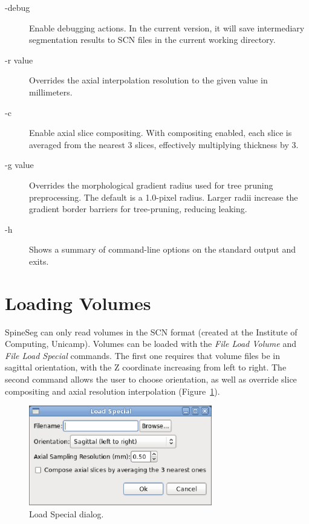 \documentclass[12pt]{report}
\begin{document}
\begin{description}
\item[-debug] Enable debugging actions. In the current version, it will save intermediary
segmentation results to SCN files in the current working directory.
\item[-r value] Overrides the axial interpolation resolution to the given value in
millimeters.
\item[-c] Enable axial slice compositing. With compositing enabled,
  each slice is averaged from the nearest 3 slices, effectively
  multiplying thickness by 3.
\item[-g value] Overrides the morphological gradient radius used for tree pruning preprocessing.
The default is a 1.0-pixel radius. Larger radii increase the gradient border barriers
for tree-pruning, reducing leaking.
\item[-h] Shows a summary of command-line options on the standard output and exits.
\end{description}

\section{Loading Volumes}

SpineSeg can only read volumes in the SCN format (created at the
Institute of Computing, Unicamp).  Volumes can be loaded with the
\emph{File \btr Load Volume} and \emph{File \btr Load Special}
commands.  The first one requires that volume files be in sagittal
orientation, with the Z coordinate increasing from left to right. The
second command allows the user to choose orientation, as well as
override slice compositing and axial resolution interpolation (Figure~\ref{f.loadspecial}).

\begin{figure}[!htb]
\begin{center}
\includegraphics[width=8cm]{loadspecial.eps}
\caption{Load Special dialog.}
\label{f.loadspecial}
\end{center}
\end{figure}
\end{document}
